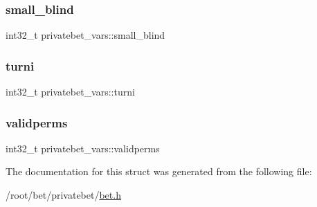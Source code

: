 \subsubsection{\texorpdfstring{small\+\_\+blind}{small\_blind}}
{\footnotesize\ttfamily int32\+\_\+t privatebet\+\_\+vars\+::small\+\_\+blind}

\mbox{\label{structprivatebet__vars_a9bda4d6f988f69e54218f62c3bcd1233}} 
\subsubsection{\texorpdfstring{turni}{turni}}
{\footnotesize\ttfamily int32\+\_\+t privatebet\+\_\+vars\+::turni}

\mbox{\label{structprivatebet__vars_a73fcbc896674210a5223a4882ac4155b}} 
\subsubsection{\texorpdfstring{validperms}{validperms}}
{\footnotesize\ttfamily int32\+\_\+t privatebet\+\_\+vars\+::validperms}



The documentation for this struct was generated from the following file\+:\begin{DoxyCompactItemize}
\item 
/root/bet/privatebet/\hyperlink{bet_8h}{bet.\+h}\end{DoxyCompactItemize}
